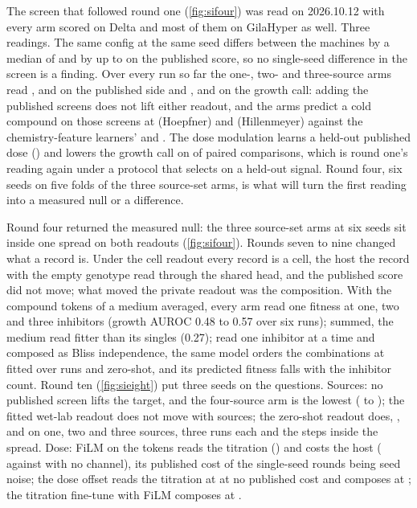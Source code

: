 The screen that followed round one
(\cref{fig:sifour}) was read on 2026.10.12 with every arm scored on Delta and most of them
on GilaHyper as well. Three readings. The same config at the same seed differs between the
machines by a median of \hydrThreemachinesmedianAbsDiff{} and by up to
\hydrThreemachinesmaxAbsDiff{} on the published score, so no single-seed difference in the
screen is a finding. Over every run so far the one-, two- and three-source arms read
\hydrThreeonegenemean{}, \hydrThreetwogenemean{} and \hydrThreethreegenemean{} on the
published side and \hydrThreeonegrowthmean{}, \hydrThreetwogrowthmean{} and
\hydrThreethreegrowthmean{} on the growth call: adding the published screens does not lift
either readout, and the arms predict a cold compound on those screens at
\hydrThreesrchoepfnercgt{} (Hoepfner) and \hydrThreesrchillenmeyercgt{} (Hillenmeyer)
against the chemistry-feature learners' \hydrThreesrchoepfnerridge{} and
\hydrThreesrchillenmeyerridge{}. The dose modulation learns a held-out published dose
(\hydrThreesrchoepfnerdose{}) and lowers the growth call on
\hydrThreedosepairsfilmLower{} of \hydrThreedosepairs{} paired comparisons, which is round
one's reading again under a protocol that selects on a held-out signal. Round four, six
seeds on five folds of the three source-set arms, is what will turn the first reading
into a measured null or a difference.

 Round four returned the measured
null: the three source-set arms at six seeds sit inside one spread on both readouts
(\cref{fig:sifour}). Rounds seven to nine changed what a record is. Under the cell
readout every record is a cell, the host the record with the empty genotype read through
the shared head, and the published score did not move; what moved the private readout was
the composition. With the compound tokens of a medium averaged, every arm read one
fitness at one, two and three inhibitors (growth AUROC 0.48 to 0.57 over six runs);
summed, the medium read fitter than its singles (0.27); read one inhibitor at a time and
composed as Bliss independence, the same model orders the combinations at
\hydmodelAuroc{} fitted over \hydmodelRuns{} runs and \hydrOneZerozsOnegrowthmean{}
zero-shot, and its predicted fitness falls with the inhibitor count. Round ten
(\cref{fig:sieight}) put three seeds on the questions. Sources: no published screen lifts
the target, and the four-source arm is the lowest (\hydrOneZeroonegenemean{} to
\hydrOneZerofourgenemean{}); the fitted wet-lab readout does not move with sources; the
zero-shot readout does, \hydrOneZerozsOnegrowthmean{}, \hydrOneZerozsTwogrowthmean{} and
\hydrOneZerozsThreegrowthmean{} on one, two and three sources, three runs each and the
steps inside the spread. Dose: FiLM on the tokens reads the titration
(\hydrOneZerodosefilmtitration{}) and costs the host (\hydrOneZerodosefilmauroc{}
against \hydrOneZerodoseoffauroc{} with no channel), its published cost of the single-seed
rounds being seed noise; the dose offset reads the titration at
\hydrOneZerodosedofftitration{} at no published cost and composes at
\hydrOneZerodosedoffauroc{}; the titration fine-tune with FiLM composes at
\hydrOneZerodoseftauroc{}.

